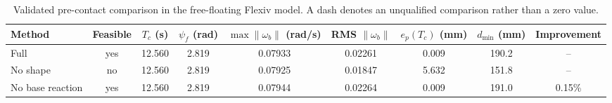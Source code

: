 \begin{table}[t]
\centering
\caption{Validated pre-contact comparison in the free-floating Flexiv model. A dash denotes an unqualified comparison rather than a zero value.}
\label{tab:precontact_comparison}
\begin{tabular}{lcccccccc}
\toprule
Method & Feasible & $T_c$ (s) & $\psi_f$ (rad) & $\max\|\omega_b\|$ (rad/s) & RMS $\|\omega_b\|$ & $e_p(T_c)$ (mm) & $d_{\min}$ (mm) & Improvement \\
\midrule
Full & yes & 12.560 & 2.819 & 0.07933 & 0.02261 & 0.009 & 190.2 & -- \\
No shape & no & 12.560 & 2.819 & 0.07925 & 0.01847 & 5.632 & 151.8 & -- \\
No base reaction & yes & 12.560 & 2.819 & 0.07944 & 0.02264 & 0.009 & 191.0 & 0.15\% \\
\bottomrule
\end{tabular}
\end{table}
